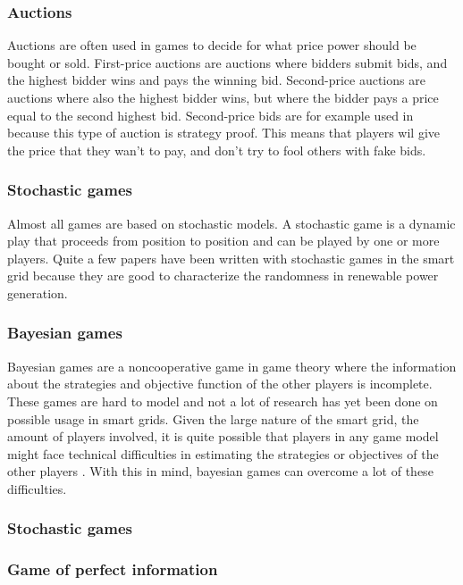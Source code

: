 \subsubsection{Auctions}
Auctions are often used in games to decide for what price power should be bought or sold. First-price auctions are auctions where bidders submit bids, and the highest bidder wins and pays the winning bid. Second-price auctions are auctions where also the highest bidder wins, but where the bidder pays a price equal to the second highest bid. Second-price bids are for example used in \cite{SaadHanPoorEtAl2011} because this type of auction is strategy proof. This means that players wil give the price that they wan't to pay, and don't try to fool others with fake bids.
\subsubsection{Stochastic games}
Almost all games are based on stochastic models. A stochastic game is a dynamic play that proceeds from position to position \cite{Shapley1953} and can be played by one or more players. Quite a few papers have been written with stochastic games in the smart grid \cite{LiangZhuang2014} because they are good to characterize the randomness in renewable power generation.  
\subsubsection{Bayesian games}
Bayesian games are a noncooperative game in game theory where the information about the strategies and objective function of the other players is incomplete. These games are hard to model and not a lot of research has yet been done on possible usage in smart grids. Given the large nature of the smart grid, the amount of players involved, it is quite possible that players in any game model might face technical difficulties in estimating the strategies or objectives of the other players \cite{keypaper}. With this in mind, bayesian games can overcome a lot of these difficulties. 

\subsubsection{Stochastic games}
\subsubsection{Game of perfect information}


